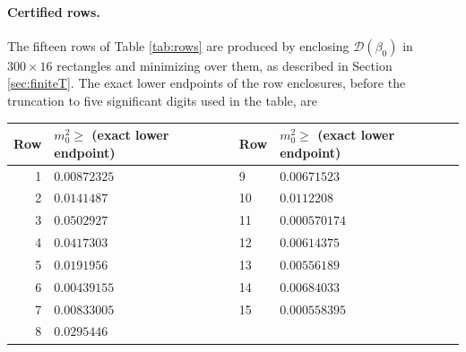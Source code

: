 \documentclass[11pt]{article}
\numberwithin{equation}{section}
\theoremstyle{definition}
\begin{document}
\paragraph{Certified rows.}
The fifteen rows of Table \ref{tab:rows} are produced by enclosing
$\mathcal{D}(\beta_0)$ in $300\times16$ rectangles and minimizing over them, as described
in Section \ref{sec:finiteT}. The exact lower endpoints of the row enclosures, before the
truncation to five significant digits used in the table, are

\begin{center}
\begin{tabular}{@{}rlll@{}}
\toprule
Row & $m_{0}^{2}\ge$ (exact lower endpoint) & Row & $m_{0}^{2}\ge$ (exact lower endpoint)\\
\midrule
1 & $0.00872325$ & 9 & $0.00671523$\\
2 & $0.0141487$ & 10 & $0.0112208$\\
3 & $0.0502927$ & 11 & $0.000570174$\\
4 & $0.0417303$ & 12 & $0.00614375$\\
5 & $0.0191956$ & 13 & $0.00556189$\\
6 & $0.00439155$ & 14 & $0.00684033$\\
7 & $0.00833005$ & 15 & $0.000558395$\\
8 & $0.0295446$ & & \\
\bottomrule
\end{tabular}
\end{center}
\end{document}
